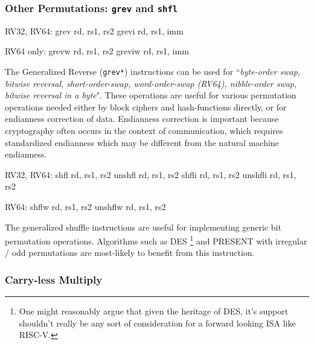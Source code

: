

\subsubsection{Other Permutations: {\tt grev} and {\tt shfl}}

\begin{isa}
RV32, RV64:
    grev rd, rs1, rs2
    grevi rd, rs1, imm

RV64 only:
    grevw rd, rs1, rs2
    greviw rd, rs1, imm
\end{isa}

The Generalized Reverse ({\tt grev*}) instructions can be used for 
``{\em byte-order swap, bitwise reversal, short-order-swap,
word-order-swap (RV64), nibble-order swap, bitwise reversal in a byte}".
These operations are useful for various permutation operations
needed either by block ciphers and hash-functions directly, or for
endianness correction of data.
Endianness correction is important because
cryptography often occurs in the context of communication, which requires
standardized endianness which may be different from the natural machine
endianness.


\begin{isa}
RV32, RV64:
    shfl    rd, rs1, rs2
    unshfl  rd, rs1, rs2
    shfli   rd, rs1, rs2
    unshfli rd, rs1, rs2

RV64:
    shflw   rd, rs1, rs2
    unshflw rd, rs1, rs2
\end{isa}

The generalized shuffle instructions are useful for implementing
generic bit permutation operations.
Algorithms such as 
DES \footnote{
One might reasonably argue that given the heritage of DES, it's support
shouldn't really be any sort of consideration for a forward looking
ISA like RISC-V.
}
and
PRESENT\cite{block:present} with
irregular / odd permutations are most-likely to benefit from this
instruction.


\subsubsection{Carry-less Multiply}

